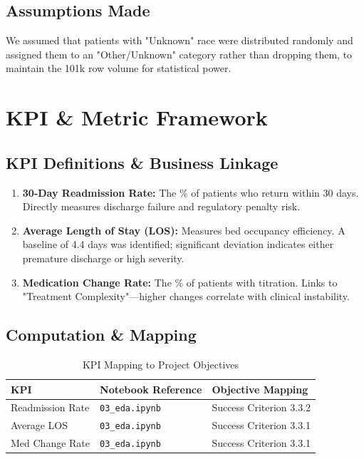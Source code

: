 \documentclass[12pt,a4paper]{article}
\begin{document}
\subsection{Assumptions Made}
We assumed that patients with "Unknown" race were distributed randomly and assigned them to an "Other/Unknown" category rather than dropping them, to maintain the 101k row volume for statistical power.

\section{KPI \& Metric Framework}
\subsection{KPI Definitions \& Business Linkage}
\begin{enumerate}
    \item \textbf{30-Day Readmission Rate:} The \% of patients who return within 30 days. Directly measures discharge failure and regulatory penalty risk.
    \item \textbf{Average Length of Stay (LOS):} Measures bed occupancy efficiency. A baseline of 4.4 days was identified; significant deviation indicates either premature discharge or high severity.
    \item \textbf{Medication Change Rate:} The \% of patients with titration. Links to "Treatment Complexity"—higher changes correlate with clinical instability.
\end{enumerate}

\subsection{Computation \& Mapping}
\begin{table}[h]
    \centering
    \begin{tabular}{lll}
        \toprule
        \textbf{KPI} & \textbf{Notebook Reference} & \textbf{Objective Mapping} \\
        \midrule
        Readmission Rate & \texttt{03\_eda.ipynb} & Success Criterion 3.3.2 \\
        Average LOS & \texttt{03\_eda.ipynb} & Success Criterion 3.3.1 \\
        Med Change Rate & \texttt{03\_eda.ipynb} & Success Criterion 3.3.1 \\
        \bottomrule
    \end{tabular}
    \caption{KPI Mapping to Project Objectives}
\end{table}
\end{document}
